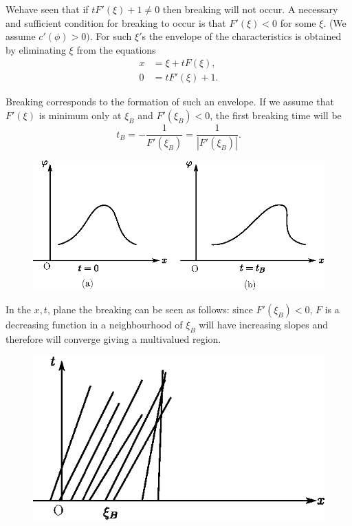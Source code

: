 We\pageoriginale have seen that if $tF'(\xi)+1\neq 0$ then breaking will not occur. A necessary and sufficient condition for breaking to occur is that $F'(\xi)<0$ for some $\xi$. (We assume $c'(\phi)>0)$. For such $\xi'$s the envelope of the characteristics is obtained by eliminating $\xi$ from the equations 
\begin{align*}
x &= \xi + tF(\xi),\\
0 &= tF'(\xi)+1.
\end{align*}

Breaking corresponds to the formation of such an envelope. If we assume that $F'(\xi)$ is minimum only at $\xi_B$ and $F'(\xi_B)<0$, the first breaking time will be 
$$
t_B= -\frac{1}{F'(\xi_B)}=\frac{1}{\left|F'(\xi_B)\right|}.
$$

\begin{figure}[H]
\centering
\includegraphics{figures/fig61-1.7.eps}
\caption{}
\label{chap1:fig1.7}
\end{figure}

In the $x,t$, plane the breaking can be seen as follows: since $F'(\xi_B)<0,\, F$ is a decreasing function in a neighbourhood of $\xi_B$ will have increasing slopes and therefore will converge giving a multivalued region. 

\begin{figure}[H]
\centering
\includegraphics{figures/fig61-1.8.eps}
\caption{}
\label{chap1:fig1.8}
\end{figure}\pageoriginale

